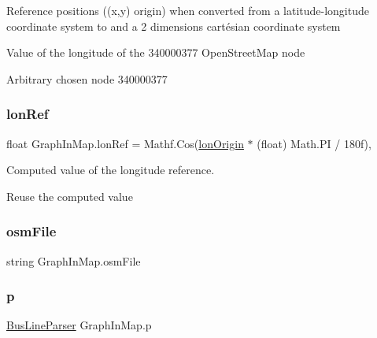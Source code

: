 Reference positions ((x,y) origin) when converted from a latitude-\/longitude coordinate system to and a 2 dimensions cartésian coordinate system 

Value of the longitude of the 340000377 Open\+Street\+Map node

Arbitrary chosen node 340000377\mbox{\label{classGraphInMap_a2781188e0f0f11ccff75ff0d07c7596d}} 
\subsubsection{\texorpdfstring{lon\+Ref}{lonRef}}
{\footnotesize\ttfamily float Graph\+In\+Map.\+lon\+Ref = Mathf.\+Cos(\hyperlink{classGraphInMap_ad976da0443161f13f73a84661e148cd5}{lon\+Origin} $\ast$ (float) Math.\+PI / 180f)\hspace{0.3cm}{\ttfamily [static]}, {\ttfamily [private]}}



Computed value of the longitude reference. 

Reuse the computed value\mbox{\label{classGraphInMap_a612a84b6c2a70a8f5fd73db6cc012ae3}} 
\subsubsection{\texorpdfstring{osm\+File}{osmFile}}
{\footnotesize\ttfamily string Graph\+In\+Map.\+osm\+File}

\mbox{\label{classGraphInMap_ab4e6ee3792c7cf819b1816c24acdcb24}} 
\subsubsection{\texorpdfstring{p}{p}}
{\footnotesize\ttfamily \hyperlink{classBusLineParser}{Bus\+Line\+Parser} Graph\+In\+Map.\+p\hspace{0.3cm}{\ttfamily [private]}}

\mbox{\label{classGraphInMap_ae6baf9b727da8e55d0634912f4e32913}} 
